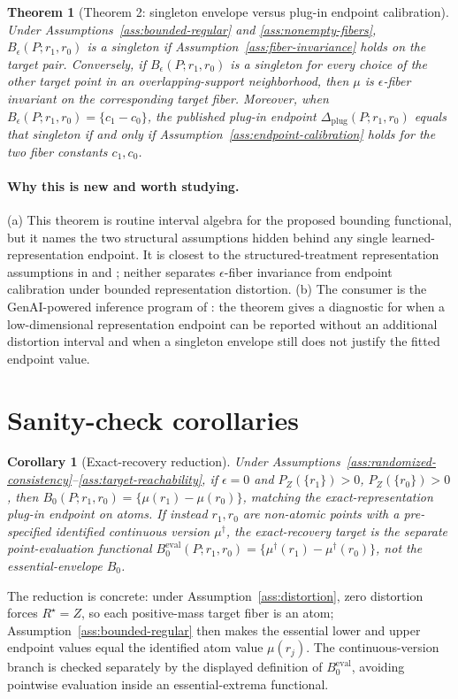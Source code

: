 \documentclass[11pt]{article}
\theoremstyle{definition}
\theoremstyle{plain}
\newtheorem{theorem}{Theorem}
\newtheorem{corollary}{Corollary}
\theoremstyle{remark}
\begin{document}
\begin{theorem}[Theorem 2: singleton envelope versus plug-in endpoint calibration]\label{thm:fiber-singleton}
Under Assumptions~\ref{ass:bounded-regular} and \ref{ass:nonempty-fibers}, \(B_\epsilon(P;r_1,r_0)\) is a singleton if Assumption~\ref{ass:fiber-invariance} holds on the target pair.  Conversely, if \(B_\epsilon(P;r_1,r_0)\) is a singleton for every choice of the other target point in an overlapping-support neighborhood, then \(\mu\) is \(\epsilon\)-fiber invariant on the corresponding target fiber.  Moreover, when \(B_\epsilon(P;r_1,r_0)=\{c_1-c_0\}\), the published plug-in endpoint \(\Delta_{\mathrm{plug}}(P;r_1,r_0)\) equals that singleton if and only if Assumption~\ref{ass:endpoint-calibration} holds for the two fiber constants \(c_1,c_0\).
\end{theorem}
\paragraph{Why this is new and worth studying.}
(a) This theorem is routine interval algebra for the proposed bounding functional, but it names the two structural assumptions hidden behind any single learned-representation endpoint.  It is closest to the structured-treatment representation assumptions in \citet{ImaiNakamura2024TextTreatments} and \citet{CorcollAndreuVlontzosORiordanGilliganLee2026}; neither separates \(\epsilon\)-fiber invariance from endpoint calibration under bounded representation distortion.  (b) The consumer is the GenAI-powered inference program of \citet{ImaiNakamura2025GPI}: the theorem gives a diagnostic for when a low-dimensional representation endpoint can be reported without an additional distortion interval and when a singleton envelope still does not justify the fitted endpoint value.

\section{Sanity-check corollaries}
\begin{corollary}[Exact-recovery reduction]\label{cor:exact}
Under Assumptions~\ref{ass:randomized-consistency}--\ref{ass:target-reachability}, if \(\epsilon=0\) and \(P_Z(\{r_1\})>0\), \(P_Z(\{r_0\})>0\), then \(B_0(P;r_1,r_0)=\{\mu(r_1)-\mu(r_0)\}\), matching the exact-representation plug-in endpoint on atoms.  If instead \(r_1,r_0\) are non-atomic points with a pre-specified identified continuous version \(\mu^\dagger\), the exact-recovery target is the separate point-evaluation functional \(B^{\mathrm{eval}}_0(P;r_1,r_0)=\{\mu^\dagger(r_1)-\mu^\dagger(r_0)\}\), not the essential-envelope \(B_0\).
\end{corollary}
The reduction is concrete: under Assumption~\ref{ass:distortion}, zero distortion forces \(R^\star=Z\), so each positive-mass target fiber is an atom; Assumption~\ref{ass:bounded-regular} then makes the essential lower and upper endpoint values equal the identified atom value \(\mu(r_j)\).  The continuous-version branch is checked separately by the displayed definition of \(B^{\mathrm{eval}}_0\), avoiding pointwise evaluation inside an essential-extrema functional.
\end{document}
